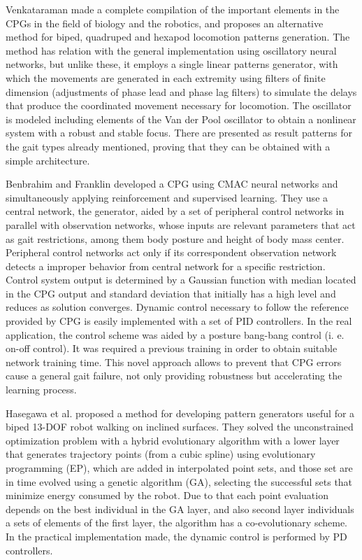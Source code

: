 Venkataraman \cite{Venkataraman97simple} made a complete compilation of the important elements in the CPGs in the field of biology and the robotics, and proposes an alternative method for biped, quadruped and hexapod locomotion patterns generation. The method has relation with the general implementation using oscillatory neural networks, but unlike these, it employs a single linear patterns generator, with which the movements are generated in each extremity using filters of finite dimension (adjustments of phase lead and phase lag filters) to simulate the delays that produce the coordinated movement necessary for locomotion. The oscillator is modeled including elements of the Van der Pool oscillator to obtain a nonlinear system with a robust and stable focus. There are presented as result patterns for the gait types already mentioned, proving that they can be obtained with a simple architecture.


Benbrahim and Franklin \cite{Benbrahim97Biped} developed a CPG using CMAC neural networks and simultaneously applying reinforcement and supervised learning. They use a central network, the generator, aided by a set of peripheral control networks in parallel with observation networks, whose inputs are relevant parameters that act as gait restrictions, among them body posture and height of body mass center. Peripheral control networks act only if its correspondent observation network detects a improper behavior from central network for a specific restriction. Control system output is determined by a Gaussian function with median located in the CPG output and standard deviation that initially has a high level and reduces as solution converges. Dynamic control necessary to follow the reference provided by CPG is easily implemented with a set of PID controllers. In the real application, the control scheme was aided by a posture bang-bang control (i. e. on-off control). It was required a previous training in order to obtain suitable network training time. This novel approach allows to prevent that CPG errors cause a general gait failure, not only providing robustness but accelerating the learning process. 


Hasegawa et al. \cite{Hasegawa00Trajectory} proposed a method for developing pattern generators useful for a biped 13-DOF robot walking on inclined surfaces. They solved the unconstrained optimization problem with a hybrid evolutionary algorithm with a lower layer that generates trajectory points (from a cubic spline) using evolutionary programming (EP), which are added in interpolated point sets, and those set are in time evolved using a genetic algorithm (GA), selecting the successful sets that minimize energy consumed by the robot. Due to that each point evaluation depends on the best individual in the GA layer, and also second layer individuals a sets of elements of the first layer, the algorithm has a co-evolutionary scheme. In the practical implementation made, the dynamic control is performed by PD controllers.


